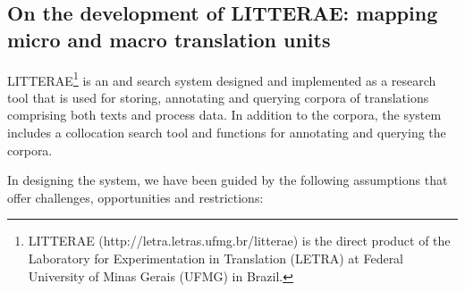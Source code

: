 \documentclass[output=paper]{LSP/langsci}
\begin{document}
\subsection{On the development of LITTERAE: mapping micro and macro translation units}\label{sec:alves:2.3}

LITTERAE\footnote{LITTERAE (http://letra.letras.ufmg.br/litterae) is the direct product of the Laboratory for Experimentation in Translation (LETRA) at Federal University of Minas Gerais (UFMG) in Brazil.} is an  and search system designed and implemented as a research tool that is used for storing, annotating and querying corpora of translations comprising both texts and process data. In addition to the corpora, the system includes a collocation search tool and functions for annotating and querying the corpora.

In designing the  system, we have been guided by the following assumptions that offer challenges, opportunities and restrictions:
\end{document}
